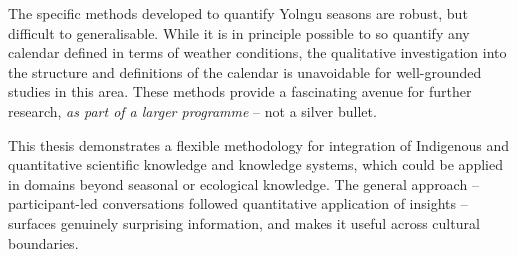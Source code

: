 The specific methods developed to quantify Yolngu seasons are robust, but
difficult to generalisable.  While it is in principle possible to so quantify
any calendar defined in terms of weather conditions, the qualitative
investigation into the structure and definitions of the calendar is unavoidable
for well-grounded studies in this area.  These methods provide a fascinating
avenue for further research, \emph{as part of a larger programme} -- not a
silver bullet.

This thesis demonstrates a flexible methodology for integration
of Indigenous and quantitative scientific knowledge and knowledge systems,
which could be applied in domains beyond seasonal or ecological knowledge.
The general approach -- participant-led conversations followed quantitative
application of insights -- surfaces genuinely surprising information, and
makes it useful across cultural boundaries.


